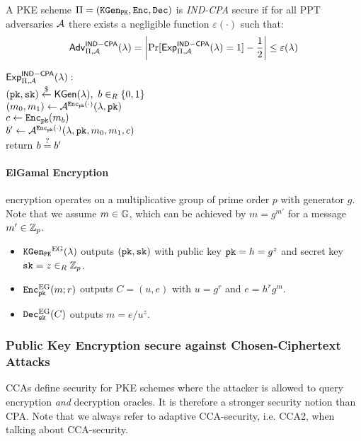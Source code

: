 \begin{definition}\label{def:indcpa}
A \ac{PKE} scheme $\Pi=(\mathtt{KGen_{PK}},\mathtt{Enc},\mathtt{Dec})$ is \emph{IND-CPA} secure if for all \ac{PPT} adversaries $\mathcal{A}$ there exists a negligible function $\varepsilon(\cdot)$ such that:
\[\mathsf{Adv}_{\Pi,\mathcal{A}}^{\mathsf{IND-CPA}}(\lambda)=\left|\Pr[\mathsf{Exp}^{\mathsf{IND-CPA}}_{\Pi,\mathcal{A}}(\lambda)=1]-\frac12\right|\leq\varepsilon(\lambda)\]

\noindent
$\mathsf{Exp}^{\mathsf{IND-CPA}}_{\Pi,\mathcal{A}}(\lambda):$\\
\hspace*{2em} $(\mathtt{pk},\mathtt{sk})\stackrel{\$}{\gets}\mathsf{KGen}(\lambda),~b\in_R\{0,1\}$\\
\hspace*{2em} $(m_0,m_1)\gets\mathcal{A}^{\mathtt{Enc}_\mathtt{pk}(\cdot)}(\lambda,\mathtt{pk})$\\
\hspace*{2em} $c\gets\mathtt{Enc}_\mathtt{pk}(m_b)$\\
\hspace*{2em} $b'\gets\mathcal{A}^{\mathtt{Enc}_\mathtt{pk}(\cdot)}(\lambda,\mathtt{pk},m_0,m_1,c)$\\
\hspace*{2em} return $b\stackrel{?}{=} b'$
\eod
\end{definition}


\paragraph{ElGamal Encryption}\label{sec:elgamalencryption}
\citet{Gamal84} encryption operates on a multiplicative group \GG of prime order $p$ with generator $g$.
Note that we assume $m\in\mathbb{G}$, which can be achieved by $m=g^{m'}$ for a message $m'\in\mathbb{Z}_p$.
\begin{itemize}
  \item $\mathtt{KGen_{PK}}^\mathrm{EG}(\lambda)$ outputs $(\mathtt{pk}, \mathtt{sk})$ with public key $\mathtt{pk}=h=g^z$ and secret key $\mathtt{sk}=z\in_R\mathbb{Z}_p$.
  \item $\mathtt{Enc}^{\mathrm{EG}}_\mathtt{pk}(m;r)$ outputs $C=(u,e)$ with $u=g^r$ and $e=h^rg^m$.
  \item $\mathtt{Dec}_\mathtt{sk}^\mathrm{EG}(C)$ outputs $m=e/u^z$.
\end{itemize}


\subsubsection[Chosen-Ciphertext Attacks]{Public Key Encryption secure against Chosen-Ciphertext Attacks}
\acp{CCA} define security for \ac{PKE} schemes where the attacker is allowed to query encryption \emph{and} decryption oracles.
It is therefore a stronger security notion than \ac{CPA}.
Note that we always refer to adaptive \ac{CCA}-security, i.e. \ac{CCA}2, when talking about \ac{CCA}-security.

